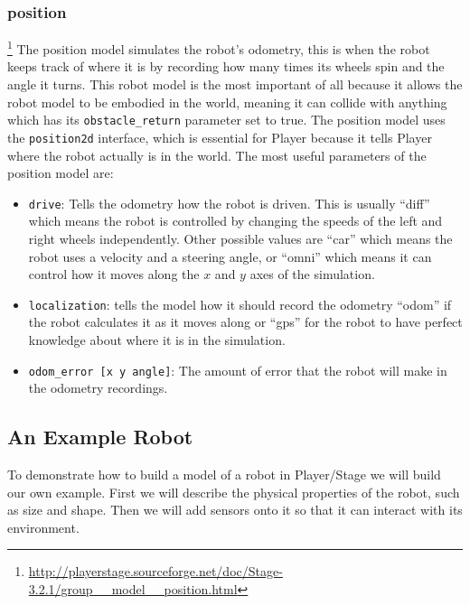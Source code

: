 \documentclass[a4paper]{report}
\newcommand{\plst}{Player/Stage\xspace}
\newcommand{\pl}{Player\xspace}
\begin{document}
\subsubsection{position}\footnote{\url{http://playerstage.sourceforge.net/doc/Stage-3.2.1/group__model__position.html}}\label{sec:BuildingAWorld:BuildingRobot:RobotSensors:Position}
The position model simulates the robot's odometry, this is when the robot keeps track of where it is by recording how many times its wheels spin and the angle it turns. This robot model is the most important of all because it allows the robot model to be embodied in the world, meaning it can collide with anything which has its \verb|obstacle_return| parameter set to true. The position model uses the \verb|position2d| interface, which is essential for \pl because it tells \pl where the robot actually is in the world.
The most useful parameters of the position model are:
\begin{itemize}
\item \verb|drive|: Tells the odometry how the robot is driven. This is usually ``diff'' which means the robot is controlled by changing the speeds of the left and right wheels independently. Other possible values are ``car'' which means the robot uses a velocity and a steering angle, or ``omni'' which means it can control how it moves along the $x$ and $y$ axes of the simulation.
\item \verb|localization|: tells the model how it should record the odometry ``odom'' if the robot calculates it as it moves along or ``gps'' for the robot to have perfect knowledge about where it is in the simulation. 
\item \verb|odom_error [x y angle]|: The amount of error that the robot will make in the odometry recordings.
\end{itemize}


\subsection{An Example Robot} \label{sec:BuildingAWorld:BuildingRobot:ExampleRobot}

To demonstrate how to build a model of a robot in \plst we will build our own example. First we will describe the physical properties of the robot, such as size and shape. Then we will add sensors onto it so that it can interact with its environment.
\end{document}

